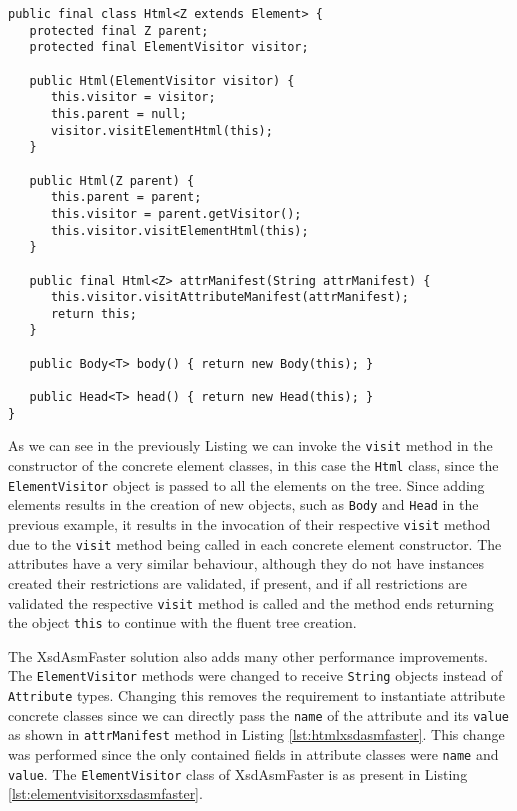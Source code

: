 \begin{minipage}{\linewidth}
\begin{lstlisting}[caption={Html Class Generated by XsdAsmFaster},label={lst:htmlxsdasmfaster}]
public final class Html<Z extends Element> {
   protected final Z parent;
   protected final ElementVisitor visitor;

   public Html(ElementVisitor visitor) {
      this.visitor = visitor;
      this.parent = null;
      visitor.visitElementHtml(this);
   }

   public Html(Z parent) {
      this.parent = parent;
      this.visitor = parent.getVisitor();
      this.visitor.visitElementHtml(this);
   }
   
   public final Html<Z> attrManifest(String attrManifest) {
      this.visitor.visitAttributeManifest(attrManifest);
      return this;
   }
   
   public Body<T> body() { return new Body(this); }
   
   public Head<T> head() { return new Head(this); }
}
\end{lstlisting}
\end{minipage}

\noindent
As we can see in the previously Listing we can invoke the \texttt{visit} method in the constructor of the concrete element classes, in this case the \texttt{Html} class, since the \texttt{ElementVisitor} object is passed to all the elements on the tree. Since adding elements results in the creation of new objects, such as \texttt{Body} and \texttt{Head} in the previous example, it results in the invocation of their respective \texttt{visit} method due to the \texttt{visit} method being called in each concrete element constructor. The attributes have a very similar behaviour, although they do not have instances created their restrictions are validated, if present, and if all restrictions are validated the respective \texttt{visit} method is called and the method ends returning the object \texttt{this} to continue with the fluent tree creation.

\newpage

\noindent
The XsdAsmFaster solution also adds many other performance improvements. The \texttt{ElementVisitor} methods were changed to receive \texttt{String} objects instead of \texttt{Attribute} types. Changing this removes the requirement to instantiate attribute concrete classes since we can directly pass the \texttt{name} of the attribute and its \texttt{value} as shown in \texttt{attrManifest} method in Listing \ref{lst:htmlxsdasmfaster}. This change was performed since the only contained fields in attribute classes were \texttt{name} and \texttt{value}. The \texttt{ElementVisitor} class of XsdAsmFaster is as present in Listing \ref{lst:elementvisitorxsdasmfaster}.

